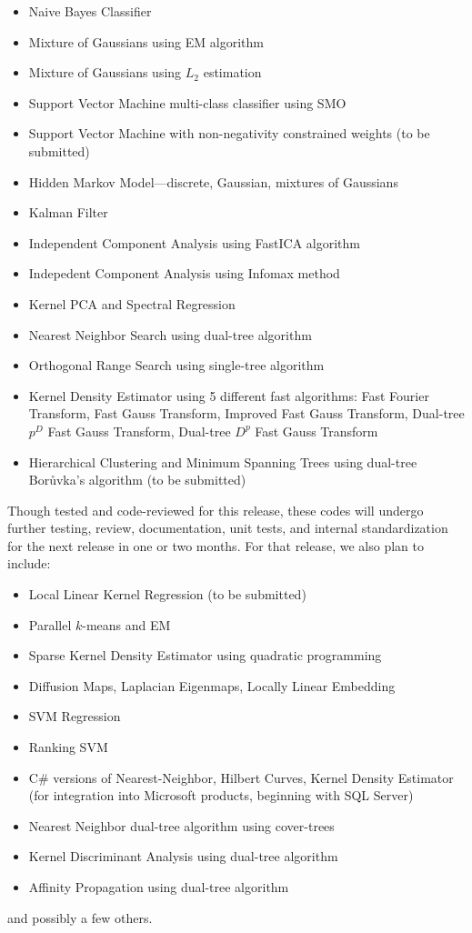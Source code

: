 \documentclass[letter]{report}
\begin{document}
\begin{enumerate}
  \begin{itemize}
  \item Naive Bayes Classifier
  \item Mixture of Gaussians using EM algorithm
  \item Mixture of Gaussians using $L_2$ estimation
  \item Support Vector Machine multi-class classifier using SMO
  \item Support Vector Machine with non-negativity constrained weights 
        (to be submitted)
  \item Hidden Markov Model---discrete, Gaussian, mixtures of Gaussians
  \item Kalman Filter \cite {kai2000le}
  \item Independent Component Analysis using FastICA algorithm \cite{hyvarinen1999far}
  \item Indepedent Component Analysis using Infomax method \cite{bell95}
  \item Kernel PCA and Spectral Regression
  \item Nearest Neighbor Search using dual-tree algorithm
  \item Orthogonal Range Search using single-tree algorithm
  \item Kernel Density Estimator using 5 different fast algorithms: Fast Fourier Transform, Fast Gauss Transform, Improved Fast Gauss Transform, Dual-tree $p^D$ Fast Gauss Transform, Dual-tree $D^p$ Fast Gauss Transform
  \item Hierarchical Clustering and Minimum Spanning Trees using 
        dual-tree Bor\r{u}vka's algorithm (to be submitted)
  \end{itemize}
Though tested and code-reviewed for this release, these codes will undergo further testing, review, documentation, unit tests, and internal standardization for the next release in one or two months.  For that release, we also plan to include:
  \begin{itemize}
  \item Local Linear Kernel Regression (to be submitted)
  \item Parallel $k$-means and EM
  \item Sparse Kernel Density Estimator using quadratic programming    
  \item Diffusion Maps, Laplacian Eigenmaps, Locally Linear Embedding
  \item SVM Regression
  \item Ranking SVM
  \item C\# versions of Nearest-Neighbor, Hilbert Curves, Kernel Density Estimator (for integration into Microsoft products, beginning with SQL Server)
  \item Nearest Neighbor dual-tree algorithm using cover-trees
  \item Kernel Discriminant Analysis using dual-tree algorithm
  \item Affinity Propagation using dual-tree algorithm
  \end{itemize}
and possibly a few others.


\end{enumerate}
\end{document}
